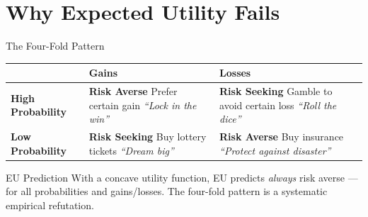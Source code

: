 \documentclass[aspectratio=169]{beamer}
\begin{document}
\section{Why Expected Utility Fails}

\begin{frame}{The Four-Fold Pattern}
\begin{center}
\begin{tabular}{p{3cm}p{4.5cm}p{4.5cm}}
\toprule
 & \textbf{Gains} & \textbf{Losses}\\
\midrule
\textbf{High Probability} & \cellcolor{softteal} \textbf{Risk Averse} \newline Prefer certain gain \newline \textit{``Lock in the win''} & \cellcolor{softrust} \textbf{Risk Seeking} \newline Gamble to avoid certain loss \newline \textit{``Roll the dice''}\\[1em]
\textbf{Low Probability} & \cellcolor{softrust} \textbf{Risk Seeking} \newline Buy lottery tickets \newline \textit{``Dream big''} & \cellcolor{softteal} \textbf{Risk Averse} \newline Buy insurance \newline \textit{``Protect against disaster''}\\
\bottomrule
\end{tabular}
\end{center}
\medskip
\begin{exampleblock}{EU Prediction}
With a concave utility function, EU predicts \textit{always} risk averse --- for all probabilities and gains/losses. The four-fold pattern is a systematic empirical refutation.
\end{exampleblock}
\end{frame}
\end{document}
